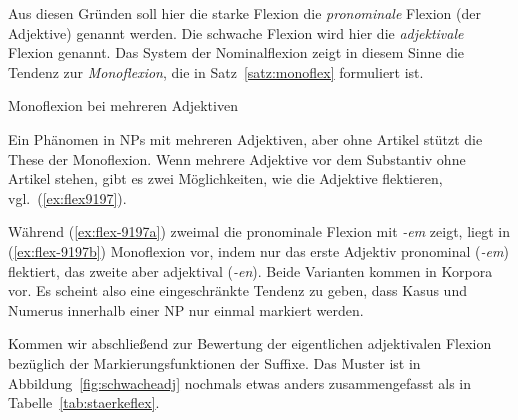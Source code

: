 Aus diesen Gründen soll hier die starke Flexion die \textit{pronominale} Flexion (der Adjektive) genannt werden.
Die schwache Flexion wird hier die \textit{adjektivale} Flexion genannt.
Das System der Nominalflexion zeigt in diesem Sinne die Tendenz zur \textit{Monoflexion}, die in Satz~\ref{satz:monoflex} formuliert ist.


\begin{Vertiefung}{Monoflexion bei mehreren Adjektiven}

\noindent Ein Phänomen in NPs mit mehreren Adjektiven, aber ohne Artikel stützt die These der Monoflexion.
Wenn mehrere Adjektive vor dem Substantiv ohne Artikel stehen, gibt es zwei Möglichkeiten, wie die Adjektive flektieren, vgl.\ (\ref{ex:flex9197}).

\begin{exe}
  \ex \label{ex:flex9197}
  \begin{xlist}
  \end{xlist}
\end{exe}

Während (\ref{ex:flex-9197a}) zweimal die pronominale Flexion mit \textit{-em} zeigt, liegt in (\ref{ex:flex-9197b}) Monoflexion vor, indem nur das erste Adjektiv pronominal (\textit{-em}) flektiert, das zweite aber adjektival (\textit{-en}).
Beide Varianten kommen in Korpora vor.
Es scheint also eine eingeschränkte Tendenz zu geben, dass Kasus und Numerus innerhalb einer NP nur einmal markiert werden.

\end{Vertiefung}


Kommen wir abschließend zur Bewertung der eigentlichen adjektivalen Flexion bezüglich der Markierungsfunktionen der Suffixe.
Das Muster ist in Abbildung~\ref{fig:schwacheadj} nochmals etwas anders zusammengefasst als in Tabelle~\ref{tab:staerkeflex}.

